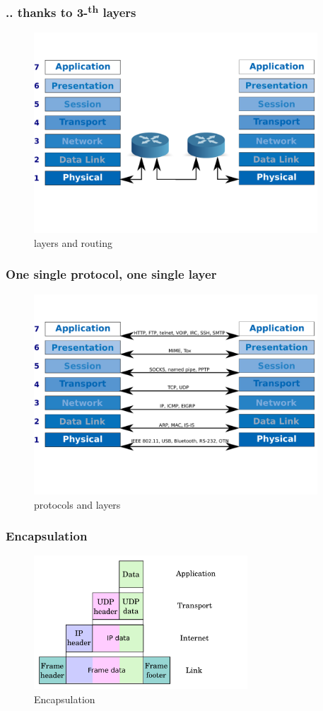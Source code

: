   \begin{frame}
    \frametitle{.. thanks to 3-\textsuperscript{th} layers}
    \begin{figure}[t]
      \centering
      \includegraphics[height=7.5cm]{./imgs/layers_routers.pdf}
      \caption{layers and routing}
      \label{fig:layers_routing}
    \end{figure}
  \end{frame}
  \begin{frame}
    \frametitle{One single protocol, one single layer}
    \begin{figure}[t]
      \centering
      \includegraphics[height=7.5cm]{./imgs/layer2protocol.pdf}
      \caption{protocols and layers}
      \label{fig:layers2proto}
    \end{figure}
  \end{frame}
  \begin{frame}
    \frametitle{Encapsulation}
    \begin{figure}[t]
      \centering
      \includegraphics[height=5cm]{./imgs/encapsulation.pdf}
      \caption{Encapsulation}
      \label{fig:encapsulation}
    \end{figure}
  \end{frame}